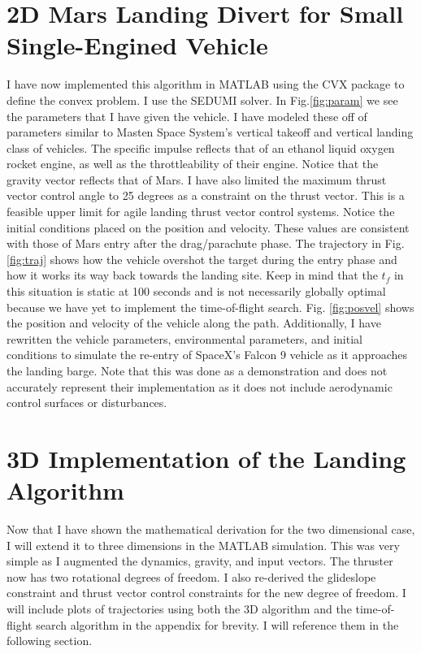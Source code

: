 \documentclass[journal]{new-aiaa}
\begin{document}
\begin{singlespace}
\section{2D Mars Landing Divert for Small Single-Engined Vehicle}
I have now implemented this algorithm in MATLAB using the CVX package to define the convex problem. I use the SEDUMI solver. In Fig.\ref{fig:param} we see the parameters that I have given the vehicle. I have modeled these off of parameters similar to Masten Space System's vertical takeoff and vertical landing class of vehicles. The specific impulse reflects that of an ethanol liquid oxygen rocket engine, as well as the throttleability of their engine. Notice that the gravity vector reflects that of Mars. I have also limited the maximum thrust vector control angle to 25 degrees as a constraint on the thrust vector. This is a feasible upper limit for agile landing thrust vector control systems. Notice the initial conditions placed on the position and velocity. These values are consistent with those  of Mars entry after the drag/parachute phase. The trajectory in Fig.\ref{fig:traj} shows how the vehicle overshot the target during the entry phase and how it works its way back towards the landing site. Keep in mind that the $t_f$ in this situation is static at 100 seconds and is not necessarily globally optimal because we have yet to implement the time-of-flight search. Fig. \ref{fig:posvel} shows the position and velocity of the vehicle along the path. Additionally, I have rewritten the vehicle parameters, environmental parameters, and initial conditions to simulate the re-entry of SpaceX's Falcon 9 vehicle as it approaches the landing barge. Note that this was done as a demonstration and does not accurately represent their implementation as it does not include aerodynamic control surfaces or disturbances.


\section{3D Implementation of the Landing Algorithm}
Now that I have shown the mathematical derivation for the two dimensional case, I will extend it to three dimensions in the MATLAB simulation. This was very simple as I augmented the dynamics, gravity, and input vectors. The thruster now has two rotational degrees of freedom. I also re-derived the glideslope constraint and thrust vector control constraints for the new degree of freedom. I will include plots of trajectories using both the 3D algorithm and the time-of-flight search algorithm in the appendix for brevity. I will reference them in the following section.



\end{singlespace}
\end{document}
